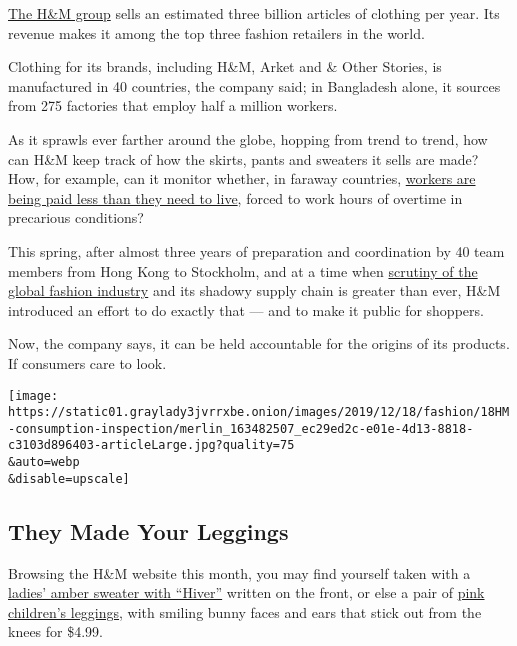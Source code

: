 \href{https://www.nytimes3xbfgragh.onion/2018/03/27/business/hm-clothes-stock-sales.html}{The
H\&M group} sells an estimated three billion articles of clothing per
year. Its revenue makes it among the top three fashion retailers in the
world.

Clothing for its brands, including H\&M, Arket and \& Other Stories, is
manufactured in 40 countries, the company said; in Bangladesh alone, it
sources from 275 factories that employ half a million workers.

As it sprawls ever farther around the globe, hopping from trend to
trend, how can H\&M keep track of how the skirts, pants and sweaters it
sells are made? How, for example, can it monitor whether, in faraway
countries,
\href{https://www.nytimes3xbfgragh.onion/2019/09/03/books/review/how-fast-fashion-is-destroying-the-planet.html}{workers
are being paid less than they need to live}, forced to work hours of
overtime in precarious conditions?

This spring, after almost three years of preparation and coordination by
40 team members from Hong Kong to Stockholm, and at a time when
\href{https://www.nytimes3xbfgragh.onion/interactive/2019/climate/sustainable-clothing.html}{scrutiny
of the global fashion industry} and its shadowy supply chain is greater
than ever, H\&M introduced an effort to do exactly that --- and to make
it public for shoppers.

Now, the company says, it can be held accountable for the origins of its
products. If consumers care to look.

\texttt{[image: https://static01.graylady3jvrrxbe.onion/images/2019/12/18/fashion/18HM-consumption-inspection/merlin\_163482507\_ec29ed2c-e01e-4d13-8818-c3103d896403-articleLarge.jpg?quality=75\\\&auto=webp\\\&disable=upscale]}

\hypertarget{they-made-your-leggings}{%
\subsection{They Made Your Leggings}\label{they-made-your-leggings}}

Browsing the H\&M website this month, you may find yourself taken with a
\href{https://www2.hm.com/en_gb/search-results.html?q=0796179002}{ladies'
amber sweater with ``Hiver''} written on the front, or else a pair of
\href{https://www2.hm.com/en_gb/productpage.0808051001.html\#modalSuppliers}{pink
children's leggings}, with smiling bunny faces and ears that stick out
from the knees for \$4.99.

